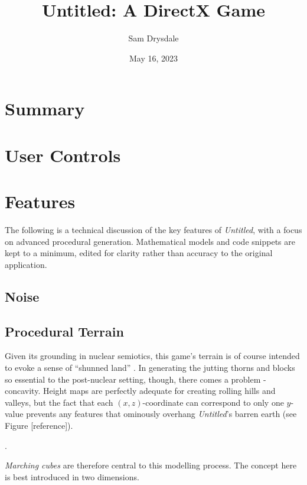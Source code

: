 \documentclass[a4paper, 11pt]{article}
\title{Untitled: A DirectX Game}
\author{Sam Drysdale}
\date{May 16, 2023}
\begin{document}
\graphicspath{{./Images/}}
\maketitle
\tableofcontents
\begin{flushleft}

\section{Summary}


\section{User Controls}


\section{Features}

The following is a technical discussion of the key features of \textit{Untitled}, with a focus on advanced procedural generation. Mathematical models and code snippets are kept to a minimum, edited for clarity rather than accuracy to the original application.

\subsection{Noise} %

\subsection{Procedural Terrain} %

Given its grounding in nuclear semiotics, this game's terrain is of course intended to evoke a sense of ``shunned land'' \citep{trth93}. In generating the jutting thorns and blocks so essential to the post-nuclear setting, though, there comes a problem - concavity. Height maps are perfectly adequate for creating rolling hills and valleys, but the fact that each $(x,z)$-coordinate can correspond to only one $y$-value prevents any features that ominously overhang \textit{Untitled}'s barren earth (see Figure [reference]).

\vspace{5pt}.

\vspace{5pt}\noindent
\textit{Marching cubes} are therefore central to this modelling process. The concept here is best introduced in two dimensions.


\end{flushleft}
\end{document}
